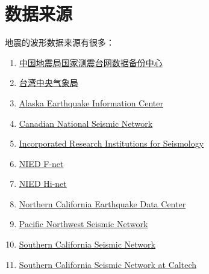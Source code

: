 \section{数据来源}
地震的波形数据来源有很多：
\begin{enumerate}
\item \href{http://www.seisdmc.ac.cn/}{中国地震局国家测震台网数据备份中心}
\item \href{http://e-service.cwb.gov.tw/wdps/}{台湾中央气象局}
\item \href{http://www.aeic.alaska.edu/}{Alaska Earthquake Information Center}
\item \href{http://www.earthquakescanada.nrcan.gc.ca/stndon/CNSN-RNSC/index-eng.php}{Canadian National Seismic Network}
\item \href{http://www.iris.edu/hq/}{Incorporated Research Institutions for Seismology}
\item \href{http://www.fnet.bosai.go.jp/}{NIED F-net}
\item \href{http://www.hinet.bosai.go.jp/}{NIED Hi-net}
\item \href{http://www.ncedc.org/}{Northern California Earthquake Data Center}
\item \href{http://pnsn.org/}{Pacific Northwest Seismic Network}
\item \href{http://www.scsn.org/}{Southern California Seismic Network}
\item \href{http://scedc.caltech.edu/}{Southern California Seismic Network at Caltech}
\end{enumerate}

